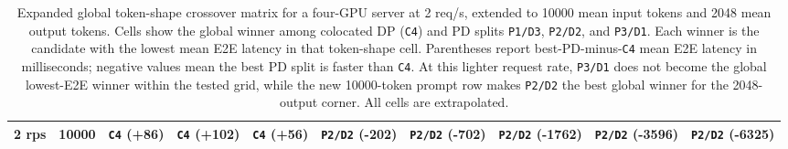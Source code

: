\begin{table}[t]
{\begin{tabular}{llcccccccc}
2 rps & 10000 & \texttt{C4} (+86) & \texttt{C4} (+102) & \texttt{C4} (+56) & \texttt{P2/D2} (-202) & \texttt{P2/D2} (-702) & \texttt{P2/D2} (-1762) & \texttt{P2/D2} (-3596) & \texttt{P2/D2} (-6325) \\
\bottomrule
\end{tabular}
}
\caption{Expanded global token-shape crossover matrix for a four-GPU server at 2 req/s, extended to 10000 mean input tokens and 2048 mean output tokens. Cells show
the global winner among colocated DP (\texttt{C4}) and PD splits
\texttt{P1/D3}, \texttt{P2/D2}, and \texttt{P3/D1}. Each winner is
the candidate with the lowest mean E2E latency in that token-shape cell.
Parentheses report best-PD-minus-\texttt{C4} mean E2E latency in
milliseconds; negative values mean the best PD split is faster than \texttt{C4}.
At this lighter request rate, \texttt{P3/D1} does not become the global
lowest-E2E winner within the tested grid, while the new 10000-token prompt
row makes \texttt{P2/D2} the best global winner for the 2048-output corner.
All cells are extrapolated.}
\label{tab:global-crossover-matrix-rps2}
\end{table}
